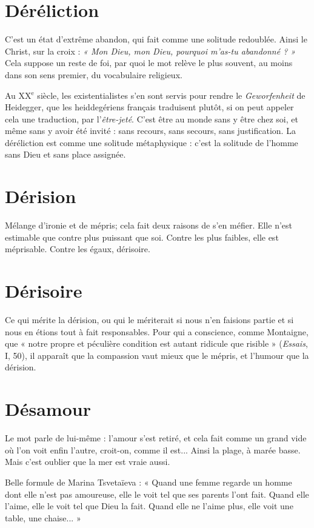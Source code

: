 \section{Déréliction}
C’est un état d’extrême abandon, qui fait comme une solitude
redoublée. Ainsi le Christ, sur la croix : {\it « Mon Dieu,
mon Dieu, pourquoi m'as-tu abandonné ? »} Cela suppose un reste de foi, par
quoi le mot relève le plus souvent, au moins dans son sens premier, du vocabulaire
religieux.

Au {\footnotesize XX$^\text{e}$} siècle, les existentialistes s’en sont servis pour rendre le {\it Geworfenheit}
de Heidegger, que les heiddegériens français traduisent plutôt, si on peut
appeler cela une traduction, par l’{\it être-jeté}. C’est être au monde sans y être chez
soi, et même sans y avoir été invité : sans recours, sans secours, sans justification.
La déréliction est comme une solitude métaphysique : c’est la solitude de
l’homme sans Dieu et sans place assignée.

\section{Dérision}
Mélange d’ironie et de mépris; cela fait deux raisons de s’en
méfier. Elle n’est estimable que contre plus puissant que soi.
Contre les plus faibles, elle est méprisable. Contre les égaux, dérisoire.

\section{Dérisoire}
Ce qui mérite la dérision, ou qui le mériterait si nous n’en faisions
partie et si nous en étions tout à fait responsables. Pour
qui a conscience, comme Montaigne, que « notre propre et péculière condition
est autant ridicule que risible » ({\it Essais}, I, 50), il apparaît que la compassion vaut
mieux que le mépris, et l’humour que la dérision.

\section{Désamour}
Le mot parle de lui-même : l'amour s’est retiré, et cela fait
comme un grand vide où l’on voit enfin l’autre, croit-on,
comme il est... Ainsi la plage, à marée basse. Mais c’est oublier que la mer est
vraie aussi.

Belle formule de Marina Tsvetaïeva : « Quand une femme regarde un
homme dont elle n’est pas amoureuse, elle le voit tel que ses parents l’ont fait.
Quand elle l’aime, elle le voit tel que Dieu la fait. Quand elle ne l'aime plus,
elle voit une table, une chaise... »

